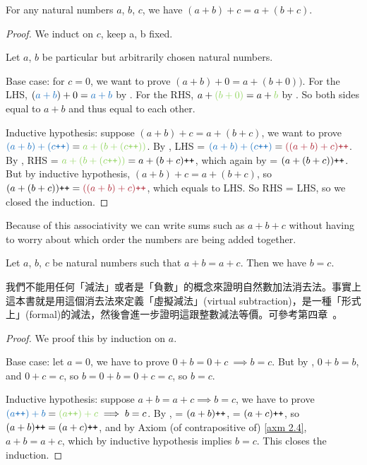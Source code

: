\begin{proposition}\label{prop 2.2.5} For any natural numbers \(a\), \(b\), \(c\), we have \((a + b) + c = a + (b + c)\).
\end{proposition}
\begin{proof}
We induct on \(c\), keep a, b fixed.

Let \(a\), \(b\) be particular but arbitrarily chosen natural numbers.

Base case: for \(c = 0\), we want to prove \((a + b) + 0 = a + (b + 0))\). For the LHS, \((\BLUE{a + b}) + 0 = \BLUE{a + b}\) by . For the RHS, \(a + \GREEN{(b + 0)} = a + \GREEN{b}\) by . So both sides equal to \(a + b\) and thus equal to each other.

Inductive hypothesis: suppose \((a + b) + c = a + (b + c)\), we want to prove \(\BLUE{(a + b) + (c\INC)} = \GREEN{a + (b + (c\INC))}\). By , LHS = \(\BLUE{(a + b) + (c\INC)} = \MAROON{((a + b) + c)\INC}\). By , RHS = \(\GREEN{a + (b + (c\INC))} = a + (b + c)\INC\), which again by  = \((a + (b + c))\texttt{++}\). But by inductive hypothesis, \((a + b) + c = a + (b + c)\), so \((a + (b + c))\INC = \MAROON{((a + b) + c)\INC}\), which equals to LHS. So RHS = LHS, so we closed the induction.
\end{proof}

\begin{note}
Because of this associativity we can write sums such as \(a + b + c\) without having to worry about which order the numbers are being added together.
\end{note}

\begin{proposition}\label{prop 2.2.6} Let \(a\), \(b\), \(c\) be natural numbers such that \(a + b = a + c\). Then we have \(b = c\).
\end{proposition}
\begin{note}
我們不能用任何「減法」或者是「負數」的概念來證明自然數加法消去法。事實上這本書就是用這個消去法來定義「虛擬減法」(virtual subtraction)，是一種「形式上」(formal)的減法，然後會進一步證明這跟整數減法等價。可參考第四章\ 。
\end{note}
\begin{proof}
We proof this by induction on \(a\).

Base case: let \(a = 0\), we have to prove \(0 + b = 0 + c\ \implies b = c\). But by , \(0 + b = b\), and \(0 + c = c\), so \(b = 0 + b = 0 + c = c\), so \(b = c\).

Inductive hypothesis: suppose \(a + b = a + c \implies b = c\), we have to prove \(\BLUE{(a\INC) + b} = \GREEN{(a\INC) + c} \implies b = c\). By ,  = \((a + b)\texttt{++}\),  = \((a + c)\texttt{++}\), so \((a + b)\texttt{++} = (a + c)\texttt{++}\), and by Axiom (of contrapositive of) \ref{axm 2.4}, \(a + b = a + c\), which by inductive hypothesis implies \(b = c\). This closes the induction.
\end{proof}

